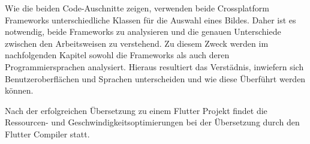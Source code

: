 \begin{minipage}{\linewidth}

\end{minipage}


\begin{minipage}{\linewidth}

\end{minipage}

Wie die beiden Code-Auschnitte zeigen, verwenden beide Crossplatform Frameworks unterschiedliche Klassen für die Auswahl eines Bildes. Daher ist es notwendig,  beide Frameworks zu analysieren und die genauen Unterschiede zwischen den Arbeitsweisen zu verstehend.  Zu diesem Zweck werden im nachfolgenden Kapitel sowohl die Frameworks als auch deren Programmiersprachen analysiert.  Hieraus resultiert das Verstädnis, inwiefern sich Benutzeroberflächen und Sprachen unterscheiden und wie diese Überführt werden können.

Nach der erfolgreichen Übersetzung zu einem Flutter Projekt findet die Ressourcen- und Geschwindigkeitsoptimierungen bei der Übersetzung durch den Flutter Compiler statt. 


